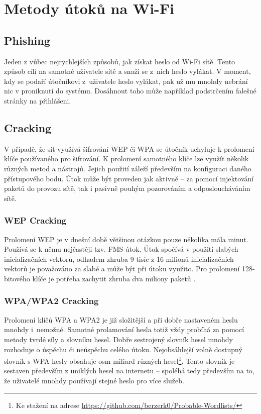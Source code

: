 \section{Metody útoků na Wi-Fi}

\subsection{Phishing}
Jeden z vůbec nejrychlejších způsobů, jak získat heslo od Wi-Fi sítě. Tento způsob cílí na samotné uživatele sítě a snaží se z~nich heslo vylákat. V moment, kdy se podaří útočníkovi z~uživatele heslo vylákat, pak už mu mnohdy nebrání nic v proniknutí do systému. Dosáhnout toho může například podstrčením falešné stránky na přihlášeni. 

\subsection{Cracking}
V případě, že sít využívá šifrování WEP či WPA se útočník uchyluje k prolomení klíče používaného pro šifrování. K prolomení samotného klíče lze využít několik různých metod a nástrojů. Jejich použití záleží především na konfiguraci daného přístupového bodu. Útok může být proveden jak aktivně -- za pomocí injektování paketů do provozu sítě, tak i pasivně pouhým pozorováním a odposloucháváním sítě. 

\subsubsection*{WEP Cracking}
Prolomení WEP je v dnešní době většinou otázkou pouze několika mála minut. Používá se k němu nejčastěji tzv. FMS útok. Útok spočívá v použití slabých inicializačních vektorů, odhadem zhruba 9 tisíc z 16 milionů inicializačních vektorů je považováno za slabé a může být při útoku využito. Pro prolomení 128-bitového klíče je potřeba zachytit zhruba dva miliony paketů \cite{stubblefield2002using}.

\subsubsection*{WPA/WPA2 Cracking}
Prolomení klíčů WPA a WPA2 je již složitější a při dobře nastaveném heslu mnohdy i~nemožné. Samotné prolamování hesla totiž vždy probíhá za pomocí metody tvrdé síly a slovníku hesel. Dobře sestrojený slovník hesel mnohdy rozhoduje o úspěchu či neúspěchu celého útoku. Nejobsáhlejší volně dostupný slovník s WPA hesly obsahuje osm miliard různých hesel\footnote{Ke stažení na adrese \url{https://github.com/berzerk0/Probable-Wordlists/}}. Tento slovník je sestaven především z uniklých hesel na internetu -- spoléhá tedy především na to, že uživatelé mnohdy používají stejné heslo pro více služeb.

